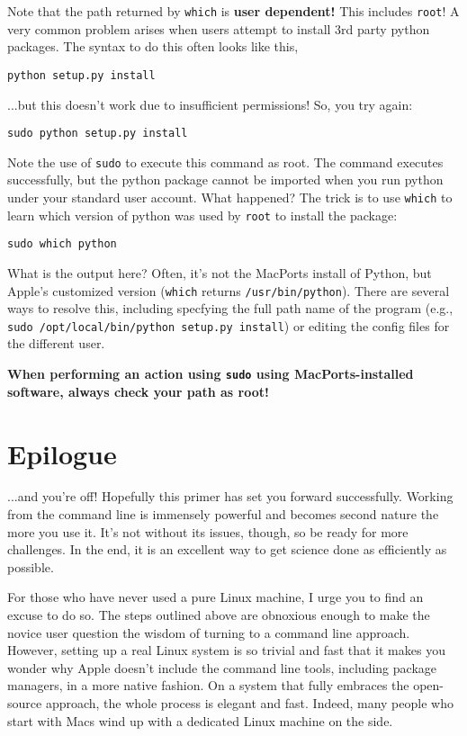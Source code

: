 \documentclass[12pt, letterpaper]{article}
\begin{document}
Note that the path returned by {\tt which} is \textbf{user dependent!}  This
includes {\tt root}!  A very common problem arises when users attempt to install
3rd party python packages.  The syntax to do this often looks like this,
\begin{verbatim}
python setup.py install
\end{verbatim}
...but this doesn't work due to insufficient permissions!  So, you try again:
\begin{verbatim}
sudo python setup.py install
\end{verbatim}
Note the use of {\tt sudo} to execute this command as root.  The command
executes successfully, but the python package cannot be imported when you run
python under your standard user account.  What happened?  The trick is to use
{\tt which} to learn which version of python was used by {\tt root} to install
the package:
\begin{verbatim}
sudo which python
\end{verbatim}
What is the output here?  Often, it's not the MacPorts install of Python, but
Apple's customized version ({\tt which} returns {\tt /usr/bin/python}).  There
are several ways to resolve this, including specfying the full path name of
the program (e.g., {\tt sudo /opt/local/bin/python setup.py install}) or editing
the config files for the different user.

\textbf{When performing an action using {\tt sudo} using MacPorts-installed
  software, always check your path as root!}

\section{Epilogue}
...and you're off!  Hopefully this primer has set you forward successfully.
Working from the command line is immensely powerful and becomes second nature
the more you use it.  It's not without its issues, though, so be ready for
more challenges.  In the end, it is an excellent way to get science done as
efficiently as possible.

For those who have never used a pure Linux machine, I urge you to find an
excuse to do so.  The steps outlined above are obnoxious enough to make
the novice user question the wisdom of turning to a command line approach.
However, setting up a real Linux system is so trivial and fast that it makes
you wonder why Apple doesn't include the command line tools, including package
managers, in a more native fashion.  On a system that fully embraces the
open-source approach, the whole process is elegant and fast.  Indeed, many
people who start with Macs wind up with a dedicated Linux machine on the side.
\end{document}
